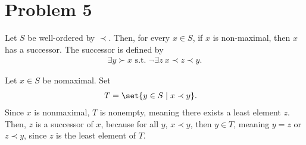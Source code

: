 \documentclass[10pt]{mypackage}
\begin{document}
\section{Problem 5}%
\begin{problem}
  Let $S$ be well-ordered by $\prec$. Then, for every $x\in S$, if $x$ is non-maximal, then $x$ has a successor. The successor is defined by
  \begin{align*}
    \exists y\succ x\text{ s.t. }\lnot\exists z~x \prec z \prec y.
  \end{align*}
\end{problem}
\begin{solution}
  Let $x\in S$ be nomaximal. Set
  \begin{align*}
    T &= \set{y\in S\mid x\prec y}.
  \end{align*}
  Since $x$ is nonmaximal, $T$ is nonempty, meaning there exists a least element $z$. Then, $z$ is a successor of $x$, because for all $y$, $x\prec y$, then $y\in T$, meaning $y=z$ or $z \prec y$, since $z$ is the least element of $T$.
\end{solution}
\end{document}
